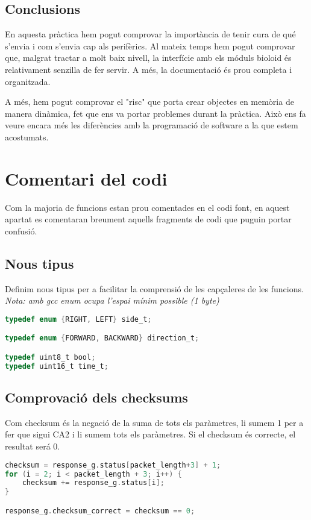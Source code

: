 \documentclass{../pdae} %
\begin{document}
\subsection{Conclusions}

En aquesta pràctica hem pogut comprovar la importància de tenir cura de qué s'envia i com s'envia cap als perifèrics. Al mateix temps hem pogut comprovar que, malgrat tractar a molt baix nivell, la interfície amb els móduls bioloid és relativament senzilla de fer servir. A més, la documentació és prou completa i organitzada.
\par A més, hem pogut comprovar el "risc" que porta crear objectes en memòria de manera dinàmica, fet que ens va portar problemes durant la pràctica. Això ens fa veure encara més les diferències amb la programació de software a la que estem acostumats.


\section{Comentari del codi}

Com la majoria de funcions estan prou comentades en el codi font, en aquest apartat es comentaran breument aquells fragments de codi que puguin portar confusió.

\subsection{Nous tipus}
Definim nous tipus per a facilitar la comprensió de les capçaleres de les funcions. \textit{Nota: amb gcc enum ocupa l'espai mínim possible (1 byte)}

\begin{lstlisting}[language=C]
typedef enum {RIGHT, LEFT} side_t;

typedef enum {FORWARD, BACKWARD} direction_t;

typedef uint8_t bool;
typedef uint16_t time_t;
\end{lstlisting}

\subsection{Comprovació dels checksums}

Com checksum és la negació de la suma de tots els paràmetres, li sumem 1 per a fer que sigui CA2 i li sumem tots els paràmetres. Si el checksum és correcte, el resultat será 0.
\begin{lstlisting}[language=C]
checksum = response_g.status[packet_length+3] + 1;
for (i = 2; i < packet_length + 3; i++) {
    checksum += response_g.status[i];
}

response_g.checksum_correct = checksum == 0;
\end{lstlisting}
\end{document}
